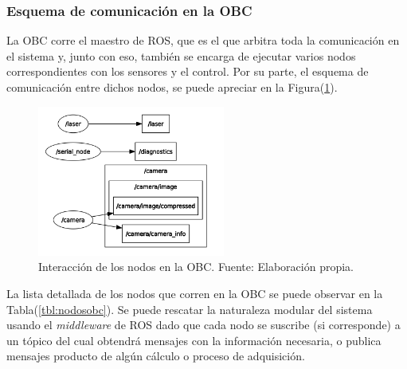     \subsubsection{Esquema de comunicación en la OBC}
    La OBC corre el maestro de ROS, que es el que arbitra toda la comunicación en el sistema y, junto con eso, también se encarga 
    de ejecutar varios nodos correspondientes con los sensores y el control. Por su parte, el esquema de comunicación entre dichos nodos, se puede apreciar en 
    la Figura(\ref{fig:nodosobc}).

    
    \begin{figure}[!h] 
        \centering
        \includegraphics[width=0.55\textwidth]{img/nodosobc}
        \caption[Interacción de los nodos en la OBC]{Interacción de los nodos en la OBC. Fuente: Elaboración propia. }
        \label{fig:nodosobc}
    \end{figure}
    
    La lista detallada de los nodos que corren en la OBC se puede observar en la Tabla(\ref{tbl:nodosobc}). Se puede rescatar la naturaleza modular 
    del sistema usando el \textit{middleware} de ROS dado que cada nodo se suscribe (si corresponde) a un tópico del cual obtendrá
    mensajes con la información necesaria, o publica mensajes producto de algún cálculo o proceso de adquisición.

